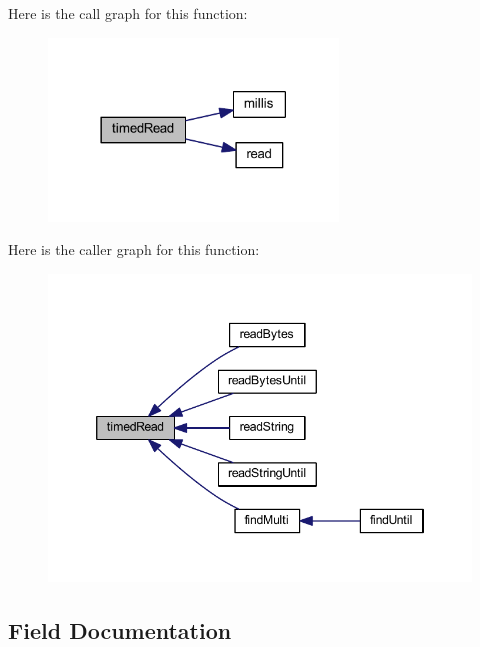 Here is the call graph for this function\+:\nopagebreak
\begin{figure}[H]
\begin{center}
\leavevmode
\includegraphics[width=218pt]{class_stream_a7cc09dd787a79c17281039b4456dc6aa_cgraph}
\end{center}
\end{figure}




Here is the caller graph for this function\+:\nopagebreak
\begin{figure}[H]
\begin{center}
\leavevmode
\includegraphics[width=346pt]{class_stream_a7cc09dd787a79c17281039b4456dc6aa_icgraph}
\end{center}
\end{figure}




\subsection{Field Documentation}
\hypertarget{class_stream_a30515d765ff208be483b71592aa9da72}{}
